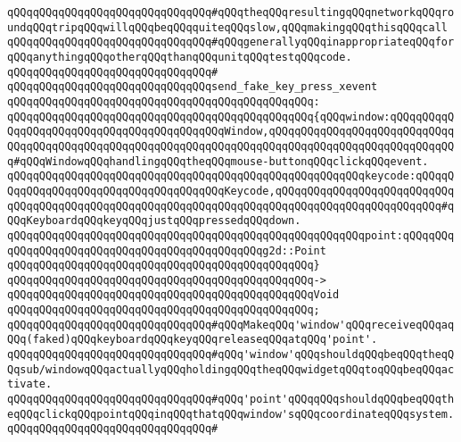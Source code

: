 \verb|qQQqqQQqqQQqqQQqqQQqqQQqqQQqqQQq#qQQqtheqQQqresultingqQQqnetworkqQQqroundqQQqtripqQQqwillqQQqbeqQQqquiteqQQqslow,qQQqmakingqQQqthisqQQqcall|\newline
\verb|qQQqqQQqqQQqqQQqqQQqqQQqqQQqqQQq#qQQqgenerallyqQQqinappropriateqQQqforqQQqanythingqQQqotherqQQqthanqQQqunitqQQqtestqQQqcode.|\newline
\verb|qQQqqQQqqQQqqQQqqQQqqQQqqQQqqQQq#|\newline
\verb|qQQqqQQqqQQqqQQqqQQqqQQqqQQqqQQqsend_fake_key_press_xevent|\newline
\verb|qQQqqQQqqQQqqQQqqQQqqQQqqQQqqQQqqQQqqQQqqQQqqQQq:|\newline
\verb|qQQqqQQqqQQqqQQqqQQqqQQqqQQqqQQqqQQqqQQqqQQqqQQq{qQQqwindow:qQQqqQQqqQQqqQQqqQQqqQQqqQQqqQQqqQQqqQQqqQQqWindow,qQQqqQQqqQQqqQQqqQQqqQQqqQQqqQQqqQQqqQQqqQQqqQQqqQQqqQQqqQQqqQQqqQQqqQQqqQQqqQQqqQQqqQQqqQQqqQQqqQQq#qQQqWindowqQQqhandlingqQQqtheqQQqmouse-buttonqQQqclickqQQqevent.|\newline
\verb|qQQqqQQqqQQqqQQqqQQqqQQqqQQqqQQqqQQqqQQqqQQqqQQqqQQqqQQqkeycode:qQQqqQQqqQQqqQQqqQQqqQQqqQQqqQQqqQQqqQQqKeycode,qQQqqQQqqQQqqQQqqQQqqQQqqQQqqQQqqQQqqQQqqQQqqQQqqQQqqQQqqQQqqQQqqQQqqQQqqQQqqQQqqQQqqQQqqQQqqQQq#qQQqKeyboardqQQqkeyqQQqjustqQQqpressedqQQqdown.|\newline
\verb|qQQqqQQqqQQqqQQqqQQqqQQqqQQqqQQqqQQqqQQqqQQqqQQqqQQqqQQqpoint:qQQqqQQqqQQqqQQqqQQqqQQqqQQqqQQqqQQqqQQqqQQqqQQqg2d::Point|\newline
\verb|qQQqqQQqqQQqqQQqqQQqqQQqqQQqqQQqqQQqqQQqqQQqqQQq}|\newline
\verb|qQQqqQQqqQQqqQQqqQQqqQQqqQQqqQQqqQQqqQQqqQQqqQQq->|\newline
\verb|qQQqqQQqqQQqqQQqqQQqqQQqqQQqqQQqqQQqqQQqqQQqqQQqVoid|\newline
\verb|qQQqqQQqqQQqqQQqqQQqqQQqqQQqqQQqqQQqqQQqqQQqqQQq;|\newline
\newline
\verb|qQQqqQQqqQQqqQQqqQQqqQQqqQQqqQQq#qQQqMakeqQQq'window'qQQqreceiveqQQqaqQQq(faked)qQQqkeyboardqQQqkeyqQQqreleaseqQQqatqQQq'point'.|\newline
\verb|qQQqqQQqqQQqqQQqqQQqqQQqqQQqqQQq#qQQq'window'qQQqshouldqQQqbeqQQqtheqQQqsub/windowqQQqactuallyqQQqholdingqQQqtheqQQqwidgetqQQqtoqQQqbeqQQqactivate.|\newline
\verb|qQQqqQQqqQQqqQQqqQQqqQQqqQQqqQQq#qQQq'point'qQQqqQQqshouldqQQqbeqQQqtheqQQqclickqQQqpointqQQqinqQQqthatqQQqwindow'sqQQqcoordinateqQQqsystem.|\newline
\verb|qQQqqQQqqQQqqQQqqQQqqQQqqQQqqQQq#|\newline
